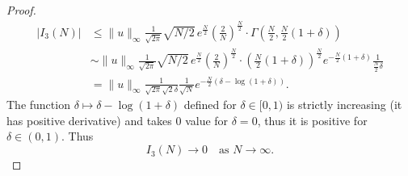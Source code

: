 \documentclass[11pt, twoside, notitlepage]{amsart}
\newcommand\R{\mathbb{R}}
\numberwithin{equation}{section}
\begin{document}
\begin{proof}
\begin{align*}
 | I_3(N)| & \le  \|u\|_\infty \frac{1}{\sqrt{2\pi}} \sqrt{N/2} \,  e^{\frac{N}{2}}\left(\frac{2}{N} \right)^{\frac{N}{2}} \cdot \Gamma\left(\frac{N}{2},\frac{N}{2}(1+\delta) \right)  \\
& \sim  \|u\|_\infty \frac{1}{\sqrt{2\pi}} \sqrt{N/2} \,  e^{\frac{N}{2}}\left(\frac{2}{N} \right)^{\frac{N}{2}} \cdot  \left(\frac{N}{2}(1+\delta) \right)^{\frac{N}{2}} e^{-\frac{N}{2}(1+\delta)} \frac{1}{\frac{N}{2}\delta} \\
&= \|u\|_\infty \frac{1}{\sqrt{2\pi} \sqrt{2} \delta} \frac{1}{\sqrt{N}} e^{-\frac{N}{2} (\delta - \log(1+\delta))}.
 \end{align*}
The function $\delta \mapsto \delta - \log(1+\delta)$ defined for $\delta \in [0,1)$ is strictly increasing (it has positive derivative) and takes $0$ value for $\delta=0$, thus it is positive for $\delta \in (0,1).$
Thus
$$I_3(N) \to 0  \quad  \text{as } N \to \infty.$$

\end{proof}
\end{document}
